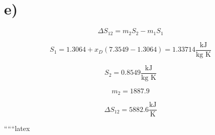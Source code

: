 

\section*{e)}

\[
\Delta S_{12} = m_2 S_2 - m_1 S_1
\]

\[
S_1 = 1.3064 + x_D (7.3549 - 1.3064) = 1.33714 \frac{\text{kJ}}{\text{kg K}}
\]

\[
S_2 = 0.8549 \frac{\text{kJ}}{\text{kg K}}
\]

\[
m_2 = 1887.9
\]

\[
\Delta S_{12} = 5882.6 \frac{\text{kJ}}{\text{K}}
\]

``````latex